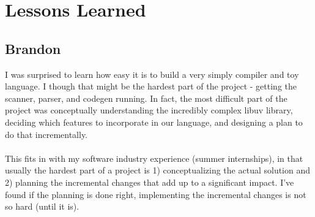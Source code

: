 \documentclass[./Report_main.tex]{subfiles}
\begin{document}


\chapter{Lessons Learned}
\section{Brandon}
I was surprised to learn how easy it is to build a very simply compiler and toy language. I though that might be the hardest part of the project - getting the scanner, parser, and codegen running. In fact, the most difficult part of the project was conceptually understanding the incredibly complex libuv library, deciding which features to incorporate in our language, and designing a plan to do that incrementally.\\\\
This fits in with my software industry experience (summer internships), in that usually the hardest part of a project is 1) conceptualizing the actual solution and 2) planning the incremental changes that add up to a significant impact. I've found if the planning is done right, implementing the incremental changes is not so hard (until it is).
\end{document}

